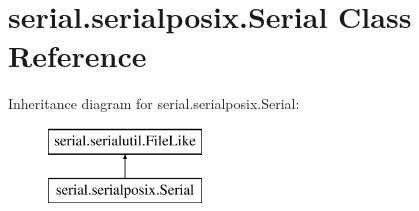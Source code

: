 \hypertarget{classserial_1_1serialposix_1_1_serial}{\section{serial.\-serialposix.\-Serial Class Reference}
\label{classserial_1_1serialposix_1_1_serial}
}
Inheritance diagram for serial.\-serialposix.\-Serial\-:\begin{figure}[H]
\begin{center}
\leavevmode
\includegraphics[height=2.000000cm]{classserial_1_1serialposix_1_1_serial}
\end{center}
\end{figure}
